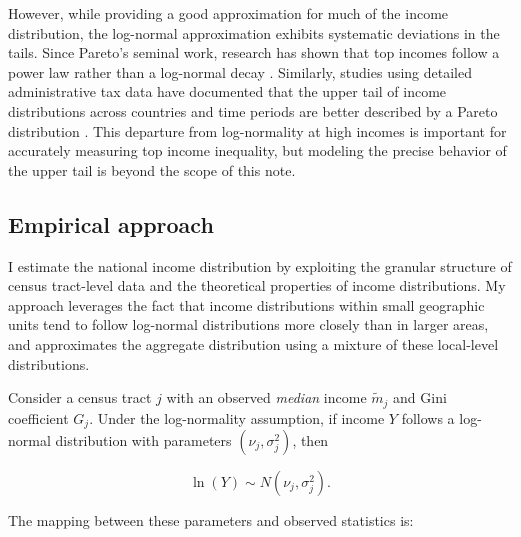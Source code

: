 However, while providing a good approximation for much of the income distribution, the log-normal approximation exhibits systematic deviations in the tails. Since Pareto's \citeyearpar{pareto1896cours} seminal work, research has shown that top incomes follow a power law rather than a log-normal decay \citep{gabaix2016power}. Similarly, studies using detailed administrative tax data have documented that the upper tail of income distributions across countries and time periods are better described by a Pareto distribution \citep{atkinson2011top}. This departure from log-normality at high incomes is important for accurately measuring top income inequality, but modeling the precise behavior of the upper tail is beyond the scope of this note.



\subsection{Empirical approach}

I estimate the national income distribution by exploiting the granular structure of census tract-level data and the theoretical properties of income distributions. My approach leverages the fact that income distributions within small geographic units tend to follow log-normal distributions more closely than in larger areas, and approximates the aggregate distribution using a mixture of these local-level distributions.

Consider a census tract $j$ with an observed \emph{median} income $\tilde m_j$ and Gini coefficient $G_j$. Under the log-normality assumption, if income $Y$ follows a log-normal distribution with parameters $(\nu_j, \sigma_j^2)$, then

\begin{equation}
\ln(Y) \sim N(\nu_j, \sigma_j^2).
\end{equation}

The mapping between these parameters and observed statistics is:

